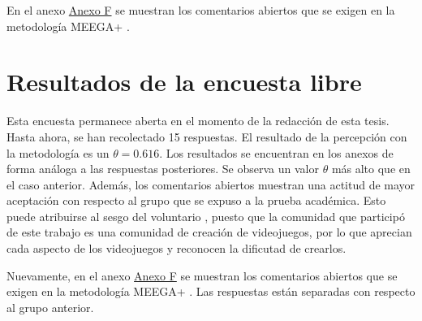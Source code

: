 En el anexo \hyperref[AnexoF]{Anexo F} se muestran los comentarios abiertos que se exigen en la metodología MEEGA+ \cite{meegaplus}.  

\section{Resultados de la encuesta libre}

Esta encuesta permanece aberta en el momento de la redacción de esta tesis. Hasta ahora, se han recolectado 15 respuestas. El resultado de la percepción con la metodología \cite{meegaplus} es un  $\theta = 0.616$. Los resultados se encuentran en los anexos de forma análoga a las respuestas posteriores. Se observa un valor $\theta$ más alto que en el caso anterior. Además, los comentarios abiertos muestran una actitud de mayor aceptación con respecto al grupo que se expuso a la prueba académica. Esto puede atribuirse al sesgo del voluntario \cite{volunterBias}, puesto que la comunidad que participó de este trabajo es una comunidad de creación de videojuegos, por lo que aprecian cada aspecto de los videojuegos y reconocen la dificutad de crearlos.

Nuevamente, en el anexo \hyperref[AnexoF]{Anexo F} se muestran los comentarios abiertos que se exigen en la metodología MEEGA+ \cite{meegaplus}. Las respuestas están separadas con respecto al grupo anterior. 
